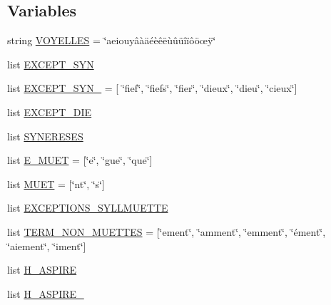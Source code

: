\subsection*{Variables}
\begin{DoxyCompactItemize}
\item 
string \hyperlink{namespacesyllabes__data_a45d6f7f31ae2938971bb79a293ded927}{V\+O\+Y\+E\+L\+L\+E\+S} = \char`\"{}aeiouyâàäéèêëùûüîïôöœÿ\char`\"{}
\item 
list \hyperlink{namespacesyllabes__data_aeedb9acbd59a6ae156c380a1a997081f}{E\+X\+C\+E\+P\+T\+\_\+\+S\+Y\+N}
\item 
list \hyperlink{namespacesyllabes__data_a47ac52c89b4b44de5b1c98b1a12023de}{E\+X\+C\+E\+P\+T\+\_\+\+S\+Y\+N\+\_} = \mbox{[} \char`\"{}fief\char`\"{}, \char`\"{}fiefs\char`\"{}, \char`\"{}fier\char`\"{}, \char`\"{}dieux\char`\"{}, \char`\"{}dieu\char`\"{}, \char`\"{}cieux\char`\"{}\mbox{]}
\item 
list \hyperlink{namespacesyllabes__data_aa4c06550f00a4d1b5c37db42d65dcfdc}{E\+X\+C\+E\+P\+T\+\_\+\+D\+I\+E}
\item 
list \hyperlink{namespacesyllabes__data_ae813159a6c35a7e4f1f7e8714003465e}{S\+Y\+N\+E\+R\+E\+S\+E\+S}
\item 
list \hyperlink{namespacesyllabes__data_af248eabf3e770c0e6a43f1415ef59516}{E\+\_\+\+M\+U\+E\+T} = \mbox{[}\char`\"{}e\char`\"{}, \char`\"{}gue\char`\"{}, \char`\"{}que\char`\"{}\mbox{]}
\item 
list \hyperlink{namespacesyllabes__data_a4d0f3acd04fcc5724d265b00cc8891fb}{M\+U\+E\+T} = \mbox{[}\char`\"{}nt\char`\"{}, \char`\"{}s\char`\"{}\mbox{]}
\item 
list \hyperlink{namespacesyllabes__data_ab907e12653d4c7ac44fb98d77c590c0d}{E\+X\+C\+E\+P\+T\+I\+O\+N\+S\+\_\+\+S\+Y\+L\+L\+M\+U\+E\+T\+T\+E}
\item 
list \hyperlink{namespacesyllabes__data_a0f5eea94775ebc51b2af4d9be6cbd1c7}{T\+E\+R\+M\+\_\+\+N\+O\+N\+\_\+\+M\+U\+E\+T\+T\+E\+S} = \mbox{[}\char`\"{}ement\char`\"{}, \char`\"{}amment\char`\"{}, \char`\"{}emment\char`\"{}, \char`\"{}ément\char`\"{}, \char`\"{}aiement\char`\"{}, \char`\"{}iment\char`\"{}\mbox{]}
\item 
list \hyperlink{namespacesyllabes__data_ac965a645cd2edfa246e2b87a7b366f16}{H\+\_\+\+A\+S\+P\+I\+R\+E}
\item 
list \hyperlink{namespacesyllabes__data_abee2655af7fb8237506dc94d013e241b}{H\+\_\+\+A\+S\+P\+I\+R\+E\+\_}
\end{DoxyCompactItemize}



